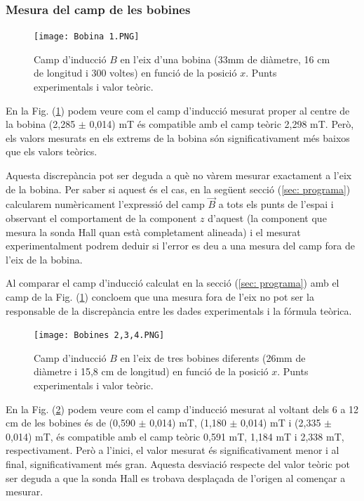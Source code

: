 \documentclass[11pt]{article}
\numberwithin{equation}{section}
\numberwithin{figure}{section}
\numberwithin{table}{section}
\begin{document}
\subsubsection{Mesura del camp de les bobines}\label{subsec: bobines}

\begin{figure}[H]
    \centering
    \texttt{[image: Bobina 1.PNG]}
    \caption{Camp d'inducció $B$ en l'eix d'una bobina (33mm de diàmetre, 16 cm de longitud i 300 voltes) en funció de la posició $x$. Punts experimentals i valor teòric.}
    \label{fig: BvsX_33mm}
\end{figure}

En la Fig. (\ref{fig: BvsX_33mm}) podem veure com el camp d'inducció mesurat proper al centre de la bobina (2,285 $\pm$ 0,014) mT és compatible amb el camp teòric 2,298 mT. Però, els valors mesurats en els extrems de la bobina són significativament més baixos que els valors teòrics.

Aquesta discrepància pot ser deguda a què no vàrem mesurar exactament a l'eix de la bobina. Per saber si aquest és el cas, en la següent secció (\ref{sec: programa}) calcularem numèricament l'expressió del camp $\vec{B}$ a tots els punts de l'espai i observant el comportament de la component $z$ d'aquest (la component que mesura la sonda Hall quan està completament alineada) i el mesurat experimentalment podrem deduir si l'error es deu a una mesura del camp fora de l'eix de la bobina. 

Al comparar el camp d'inducció calculat en la secció (\ref{sec: programa}) amb el camp de la Fig. (\ref{fig: BvsX_33mm}) concloem que una mesura fora de l'eix no pot ser la responsable de la discrepància entre les dades experimentals i la fórmula teòrica.

\begin{figure}[H]
    \centering
    \texttt{[image: Bobines 2,3,4.PNG]}
    \caption{Camp d'inducció $B$ en l'eix de tres bobines diferents (26mm de diàmetre i 15,8 cm de longitud) en funció de la posició $x$. Punts experimentals i valor teòric.}
    \label{fig: BvsX_26mm}
\end{figure}

En la Fig. (\ref{fig: BvsX_26mm}) podem veure com el camp d'inducció mesurat al voltant dels 6 a 12 cm de les bobines és de (0,590 $\pm$ 0,014) mT, (1,180 $\pm$ 0,014) mT i (2,335 $\pm$ 0,014) mT, és compatible amb el camp teòric 0,591 mT, 1,184 mT i 2,338 mT, respectivament. Però a l'inici, el valor mesurat és significativament menor i al final, significativament més gran. Aquesta desviació respecte del valor teòric pot ser deguda a que la sonda Hall es trobava desplaçada de l'origen al començar a mesurar.
\end{document}
